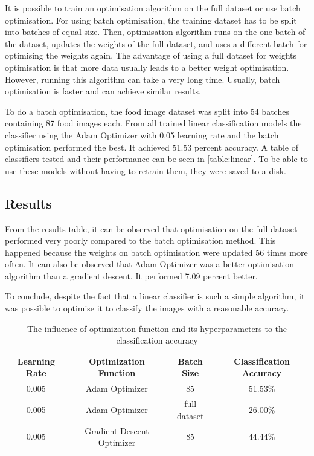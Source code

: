 It is possible to train an optimisation algorithm on the full dataset or use batch optimisation. For using batch optimisation,  the training dataset has to be split into batches of equal size. Then, optimisation algorithm runs on the one batch of the dataset, updates the weights of the full dataset, and uses a different batch for optimising the weights again. The advantage of using a full dataset for weights optimisation is that more data usually leads to a better weight optimisation. However, running this algorithm can take a very long time. Usually, batch optimisation is faster and can achieve similar results.

To do a batch optimisation, the food image dataset was split into 54 batches containing 87 food images each. From all trained linear classification models the classifier using the Adam Optimizer with 0.05 learning rate and the batch optimisation performed the best. It achieved 51.53 percent accuracy. A table of classifiers tested and their performance can be seen in \autoref{table:linear}. To be able to use these models without having to retrain them, they were saved to a disk.


\subsection{Results}
From the results table, it can be observed that optimisation on the full dataset performed very poorly compared to the batch optimisation method.  This happened because the weights on batch optimisation were updated 56 times more often. It can also be observed that Adam Optimizer was a better optimisation algorithm than a gradient descent. It performed 7.09 percent better.

To conclude, despite the fact that a linear classifier is such a simple algorithm, it was possible to optimise it to classify the images with a reasonable accuracy.

\begin{table}[h]
\begin{center}
\begin{tabular}{ |c|c|c|c| } 
 \hline
 Learning Rate &   Optimization Function & Batch Size & Classification Accuracy \\   \hline
0.005    &   Adam Optimizer  &  85  & 51.53\% \\
0.005    &   Adam Optimizer  &  full dataset  & 26.00\% \\
0.005    &   Gradient Descent Optimizer  &  85  & 44.44\% \\ 
 \hline
\end{tabular}
\caption{The influence of optimization function and its hyperparameters to the classification accuracy}
\label{table:linear}
\end{center}
\end{table}

